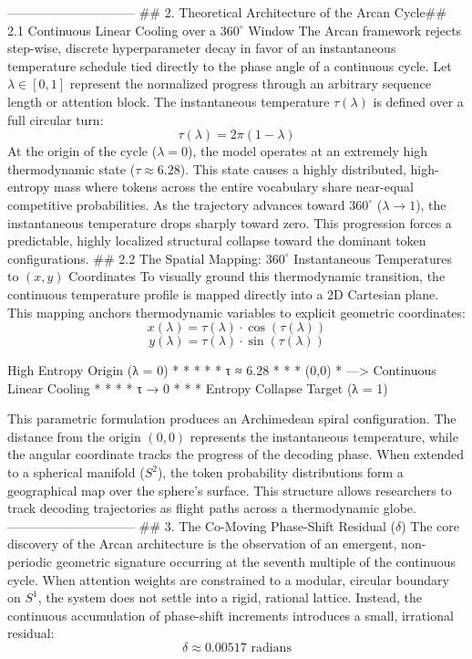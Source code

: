 ------------------------------
## 2. Theoretical Architecture of the Arcan Cycle## 2.1 Continuous Linear Cooling over a $360^\circ$ Window
The Arcan framework rejects step-wise, discrete hyperparameter decay in favor of an instantaneous temperature schedule tied directly to the phase angle of a continuous cycle. Let $\lambda \in [0, 1]$ represent the normalized progress through an arbitrary sequence length or attention block. The instantaneous temperature $\tau(\lambda)$ is defined over a full circular turn:
$$\tau(\lambda) = 2\pi(1 - \lambda)$$ 
At the origin of the cycle ($\lambda = 0$), the model operates at an extremely high thermodynamic state ($\tau \approx 6.28$). This state causes a highly distributed, high-entropy mass where tokens across the entire vocabulary share near-equal competitive probabilities. As the trajectory advances toward $360^\circ$ ($\lambda \to 1$), the instantaneous temperature drops sharply toward zero. This progression forces a predictable, highly localized structural collapse toward the dominant token configurations.
## 2.2 The Spatial Mapping: $360^\circ$ Instantaneous Temperatures to $(x, y)$ Coordinates
To visually ground this thermodynamic transition, the continuous temperature profile is mapped directly into a 2D Cartesian plane. This mapping anchors thermodynamic variables to explicit geometric coordinates:
$$x(\lambda) = \tau(\lambda) \cdot \cos(\tau(\lambda))$$ 
$$y(\lambda) = \tau(\lambda) \cdot \sin(\tau(\lambda))$$ 

            High Entropy Origin (λ = 0)
                   *   *   *
                *             *   τ ≈ 6.28
              *                 *
             *        (0,0)      * ---> Continuous Linear Cooling
              *                 *
                *             *   τ → 0
                   *   *   *
            Entropy Collapse Target (λ = 1)

This parametric formulation produces an Archimedean spiral configuration. The distance from the origin $(0,0)$ represents the instantaneous temperature, while the angular coordinate tracks the progress of the decoding phase. When extended to a spherical manifold ($S^2$), the token probability distributions form a geographical map over the sphere's surface. This structure allows researchers to track decoding trajectories as flight paths across a thermodynamic globe.
------------------------------
## 3. The Co-Moving Phase-Shift Residual ($\delta$)
The core discovery of the Arcan architecture is the observation of an emergent, non-periodic geometric signature occurring at the seventh multiple of the continuous cycle.
When attention weights are constrained to a modular, circular boundary on $S^1$, the system does not settle into a rigid, rational lattice. Instead, the continuous accumulation of phase-shift increments introduces a small, irrational residual:
$$\delta \approx 0.00517 \text{ radians}$$ 


